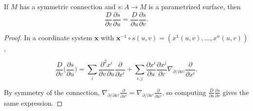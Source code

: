 \begin{lemma}[symmetry]
  \label{lem:dc-ch3-3-4}


  If $M$ has a symmetric connection and $s:A\to M$ is a parametrized surface, then
  $$
  \frac{D}{\partial v}\frac{\partial s}{\partial u}=\frac{D}{\partial u}\frac{\partial s}{\partial v}.
  $$
\end{lemma}
\begin{proof}
  \sketch

  In a coordinate system $\mathbf{x}$ with
  $\mathbf{x}^{-1}\circ s(u,v)=(x^1(u,v),\dots,x^n(u,v))$,

  $$
  \frac{D}{\partial v}\Big(\frac{\partial s}{\partial u}\Big)=\sum_i\frac{\partial^2 x^i}{\partial v\,\partial u}\frac{\partial}{\partial x^i}+\sum_{i,j}\frac{\partial x^i}{\partial u}\frac{\partial x^j}{\partial v}\nabla_{\partial/\partial x^j}\frac{\partial}{\partial x^i}.
  $$

  By symmetry of the connection,
  $\nabla_{\partial/\partial x^j}\frac{\partial}{\partial x^i}=\nabla_{\partial/\partial x^i}\frac{\partial}{\partial x^j}$,
  so computing $\frac{D}{\partial u}\frac{\partial s}{\partial v}$ gives the same
  expression.
\end{proof}

